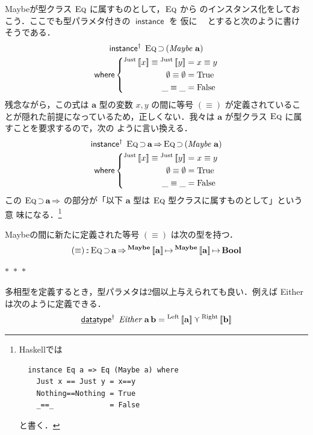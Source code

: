 \documentclass[a5paper,twoside,fleqn,draft]{jsbook}
\def\[{\left[\!\left[}
\def\]{\right]\!\right]}
\newcommand{\separator}{\begin{center}$*$~$*$~$*$\end{center}}
\newcommand{\programminglanguage}[1]{\textsf{#1}}
\newcommand{\haskell}{\programminglanguage{Haskell}}
\newcommand{\mKeyword}[1]{\mathsf{#1}} %
\newcommand{\mKeywordUnderline}[1]{\text{\underline{\textsf{#1}}}} %
\newcommand{\mDataTypeKeyword}{\mKeywordUnderline{data}\mKeyword{type}}
\newcommand{\mInstanceKeyword}{\mKeyword{instance}}
\newcommand{\mWhereKeyword}{\mKeyword{where}}
\DeclareMathOperator{\mDataTypeParametric}{\mDataTypeKeyword^\dagger}
\DeclareMathOperator{\mInstance}{\mInstanceKeyword}
\DeclareMathOperator{\mInstanceParametric}{\mInstanceKeyword^{\dagger}}
\DeclareMathOperator{\mSuperClass}{\Rightarrow}
\DeclareMathOperator{\mSuperSet}{\supset}
\DeclareMathOperator{\mWhere}{\mWhereKeyword}
\newcommand{\mSpecialConstant}[1]{\textrm{#1}} %
\newcommand{\mFalse}{\mSpecialConstant{False}}
\newcommand{\mNothing}{\emptyset}
\newcommand{\mTrue}{\mSpecialConstant{True}}
\newcommand{\mAnyParam}{\_}
\DeclareMathOperator{\mIn}{{:\!:}}
\DeclareMathOperator{\mMapsTo}{\mapsto}
\DeclareMathOperator{\mValueOr}{\curlyvee}
\newcommand{\mSpecialSub}[1]{\text{#1}}
\newcommand{\mLeft}{\mSpecialSub{Left}}
\newcommand{\mRight}{\mSpecialSub{Right}}
\newcommand{\mType}[1]{\mathbf{#1}}
\newcommand{\mBoolType}{\mType{Bool}}
\newcommand{\mGenericTypeAssemble}[2]{{}^{\mType{#1}}\[\mType{#2}\]}
\newcommand{\mMaybeType}[1]{\mGenericTypeAssemble{Maybe}{#1}}
\newcommand{\mTypeConstructor}[1]{\textit{#1}}
\DeclareMathOperator{\mEitherTypeConstructor}{\mTypeConstructor{Either}}
\DeclareMathOperator{\mMaybeTypeConstructor}{\mTypeConstructor{Maybe}}
\newcommand{\mValueConstructor}[1]{\mathrm{#1}}
\newcommand{\mGenericValueAssemble}[2]{{}^\mValueConstructor{#1}\[#2\]}
\newcommand{\mLeftWith}[1]{\mGenericValueAssemble{\mLeft}{#1}}
\newcommand{\mRightWith}[1]{\mGenericValueAssemble{\mRight}{#1}}
\newcommand{\mJustWith}[1]{\mGenericValueAssemble{Just}{#1}}
\newcommand{\mGenericTypeClass}[1]{\textsc{#1}} %
\newcommand{\mEqTypeClass}{\mGenericTypeClass{Eq}}
\newcommand{\mProj}[2]{#1\mMapsTo#2}
\begin{document}
Maybeが型クラス $\mEqTypeClass$ に属すものとして，$\mEqTypeClass$ から
のインスタンス化をしておこう．ここでも型パラメタ付きの $\mInstance$ を
仮に $\mInstanceParametric$ とすると次のように書けそうである．
\begin{multline}
\mInstanceParametric\;
\mEqTypeClass\mSuperSet{}(\mMaybeTypeConstructor\,\mType{a})\\
\mWhere
\left\{
\begin{aligned}
\mJustWith{x}\equiv\mJustWith{y}&=x\equiv y\\
\mNothing\equiv\mNothing&=\mTrue\\
\mAnyParam\equiv\mAnyParam&=\mFalse
\end{aligned}
\right.
\end{multline}
残念ながら，この式は $\mType{a}$ 型の変数 $x,y$ の間に等号 $(\equiv)$
が定義されていることが隠れた前提になっているため，正しくない．我々は
$\mType{a}$ が型クラス $\mEqTypeClass$ に属すことを要求するので，次の
ように言い換える．
\begin{multline}
\mInstanceParametric\;
\mEqTypeClass\mSuperSet\mType{a}
\mSuperClass
\mEqTypeClass\mSuperSet{}(\mMaybeTypeConstructor\,\mType{a})\\
\mWhere
\left\{
\begin{aligned}
\mJustWith{x}\equiv\mJustWith{y}&=x\equiv y\\
\mNothing\equiv\mNothing&=\mTrue\\
\mAnyParam\equiv\mAnyParam&=\mFalse
\end{aligned}
\right.
\end{multline}
この $\mEqTypeClass\mSuperSet\mType{a}\mSuperClass$ の部分が「以下
$\mType{a}$ 型は $\mEqTypeClass$ 型クラスに属すものとして」という意
味になる．\footnote{\haskell では
\begin{verbatim}
  instance Eq a => Eq (Maybe a) where
    Just x == Just y = x==y
    Nothing==Nothing = True
    _==_             = False
\end{verbatim}
と書く．
}

Maybeの間に新たに定義された等号 $(\equiv)$ は次の型を持つ．
\begin{equation}
(\equiv)
\mIn{}\mEqTypeClass\mSuperSet\mType{a}
\mSuperClass\mProj{\mMaybeType{a}}{\mProj{\mMaybeType{a}}{\mBoolType}}
\end{equation}

\separator

多相型を定義するとき，型パラメタは2個以上与えられても良い．例えば
Eitherは次のように定義できる．
\begin{equation}
\mDataTypeParametric\;\mEitherTypeConstructor\,\mType{a}\,\mType{b}
=\mLeftWith{\mType{a}}
\mValueOr
\mRightWith{\mType{b}}
\end{equation}
\end{document}
